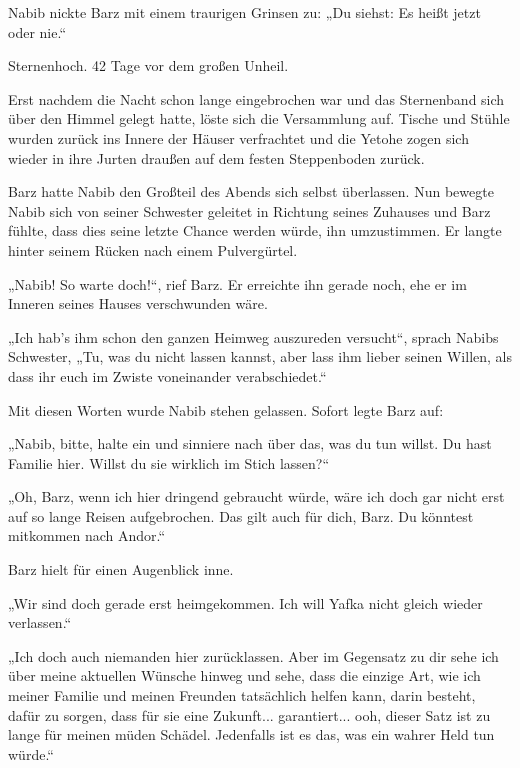 Nabib nickte Barz mit einem traurigen Grinsen zu: „Du siehst: Es heißt jetzt oder nie.“\bigskip







Sternenhoch. 42 Tage vor dem großen Unheil.\bigskip



Erst nachdem die Nacht schon lange eingebrochen war und das Sternenband sich über den Himmel gelegt hatte, löste sich die Versammlung auf. Tische und Stühle wurden zurück ins Innere der Häuser verfrachtet und die Yetohe zogen sich wieder in ihre Jurten draußen auf dem festen Steppenboden zurück.

Barz hatte Nabib den Großteil des Abends sich selbst überlassen. Nun bewegte Nabib sich von seiner Schwester geleitet in Richtung seines Zuhauses und Barz fühlte, dass dies seine letzte Chance werden würde, ihn umzustimmen. Er langte hinter seinem Rücken nach einem Pulvergürtel.

„Nabib! So warte doch!“, rief Barz. Er erreichte ihn gerade noch, ehe er im Inneren seines Hauses verschwunden wäre.

„Ich hab’s ihm schon den ganzen Heimweg auszureden versucht“, sprach Nabibs Schwester, „Tu, was du nicht lassen kannst, aber lass ihm lieber seinen Willen, als dass ihr euch im Zwiste voneinander verabschiedet.“

Mit diesen Worten wurde Nabib stehen gelassen. Sofort legte Barz auf:

„Nabib, bitte, halte ein und sinniere nach über das, was du tun willst. Du hast Familie hier. Willst du sie wirklich im Stich lassen?“

„Oh, Barz, wenn ich hier dringend gebraucht würde, wäre ich doch gar nicht erst auf so lange Reisen aufgebrochen. Das gilt auch für dich, Barz. Du könntest mitkommen nach Andor.“

Barz hielt für einen Augenblick inne.

„Wir sind doch gerade erst heimgekommen. Ich will Yafka nicht gleich wieder verlassen.“

„Ich doch auch niemanden hier zurücklassen. Aber im Gegensatz zu dir sehe ich über meine aktuellen Wünsche hinweg und sehe, dass die einzige Art, wie ich meiner Familie und meinen Freunden tatsächlich helfen kann, darin besteht, dafür zu sorgen, dass für sie eine Zukunft... garantiert... ooh, dieser Satz ist zu lange für meinen müden Schädel. Jedenfalls ist es das, was ein wahrer Held tun würde.“

